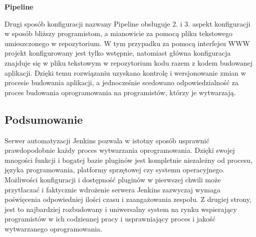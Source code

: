 \documentclass[12pt]{article}
\renewcommand{\_}{\kern-1.5pt\textunderscore\kern-1.5pt}
\begin{document}
\begin{adjustwidth}{1.0in}{0.0in}
{\fontsize{13pt}{15.6pt}\selectfont \textbf{Pipeline}\par}\par

\end{adjustwidth}


\vspace{\baselineskip}
\begin{adjustwidth}{1.0in}{0.0in}
Drugi sposób konfiguracji nazwany Pipeline obsługuje 2. i 3. aspekt konfiguracji w sposób bliższy programistom, a mianowicie za pomocą pliku tekstowego umieszczonego w repozytorium. W tym przypadku za pomocą interfejsu WWW projekt konfigurowany jest tylko wstępnie, natomiast główna konfiguracja znajduje się w pliku tekstowym w repozytorium kodu razem z kodem budowanej aplikacji. Dzięki temu rozwiązaniu uzyskano kontrolę i wersjonowanie zmian w procesie budowania aplikacji, a jednocześnie scedowano odpowiedzialność za proces budowania oprogramowania na programistów, którzy je wytwarzają.\par

\end{adjustwidth}


\vspace{\baselineskip}
\begin{adjustwidth}{0.5in}{0.0in}
\subsection*{Podsumowanie}
\end{adjustwidth}

\begin{adjustwidth}{1.0in}{0.0in}
Serwer automatyzacji Jenkins pozwala w istotny sposób usprawnić prawdopodobnie każdy proces wytwarzania oprogramowania. Dzięki swojej mnogości funkcji i bogatej bazie pluginów jest kompletnie niezależny od procesu, języka programowania, platformy sprzętowej czy systemu operacyjnego. Możliwości konfiguracji i dostępność pluginów w pierwszej chwili może przytłaczać i faktycznie wdrożenie serwera Jenkins zazwyczaj wymaga poświęcenia odpowiedniej ilości czasu i zaangażowania zespołu. Z drugiej strony, jest to najbardziej rozbudowany i uniwersalny system na rynku wspierający programistów w ich codziennej pracy i usprawniający proces i jakość wytwarzanego oprogramowania.\par

\end{adjustwidth}
\end{document}
